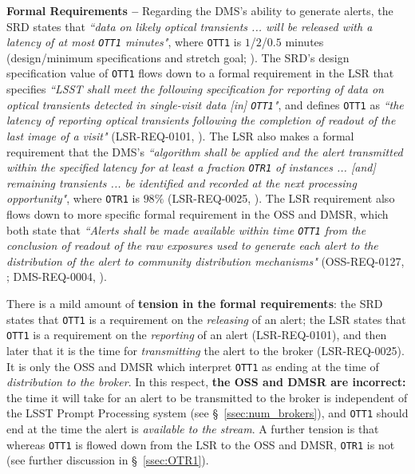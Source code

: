 \documentclass[DM,authoryear,toc]{lsstdoc}
\begin{document}
{\bf Formal Requirements --} Regarding the DMS's ability to generate alerts, the SRD states that {\it ``data on likely optical transients ... will be released with a latency of at most {\tt OTT1} minutes"}, where {\tt OTT1} is $1$/$2$/$0.5$ minutes (design/minimum specifications and stretch goal; ). The SRD's design specification value of {\tt OTT1} flows down to a formal requirement in the LSR that specifies {\it ``LSST shall meet the following specification for reporting of data on optical transients detected in single-visit data [in] {\tt OTT1}"}, and defines {\tt OTT1} as {\it ``the latency of reporting optical transients following the completion of readout of the last image of a visit"} (LSR-REQ-0101, ). The LSR also makes a formal requirement that the DMS's {\it ``algorithm shall be applied and the alert transmitted within the specified latency for at least a fraction {\tt OTR1} of instances ... [and] remaining transients ... be identified and recorded at the next processing opportunity"}, where {\tt OTR1} is $98\%$ (LSR-REQ-0025, ). The LSR requirement also flows down to more specific formal requirement in the OSS and DMSR, which both state that {\it ``Alerts shall be made available within time {\tt OTT1} from the conclusion of readout of the raw exposures used to generate each alert to the distribution of the alert to community distribution mechanisms"} (OSS-REQ-0127, ; DMS-REQ-0004, ).

There is a mild amount of {\bf tension in the formal requirements}: the SRD states that {\tt OTT1} is a requirement on the {\it releasing} of an alert; the LSR states that {\tt OTT1} is a requirement on the {\it reporting} of an alert (LSR-REQ-0101), and then later that it is the time for {\it transmitting} the alert to the broker (LSR-REQ-0025). It is only the OSS and DMSR which interpret {\tt OTT1} as ending at the time of {\it distribution to the broker}. In this respect, {\bf the OSS and DMSR are incorrect:} the time it will take for an alert to be transmitted to the broker is independent of the LSST Prompt Processing system (see \S~\ref{ssec:num_brokers}), and {\tt OTT1} should end at the time the alert is {\it available to the stream}. A further tension is that whereas {\tt OTT1} is flowed down from the LSR to the OSS and DMSR, {\tt OTR1} is not (see further discussion in \S~\ref{ssec:OTR1}).
\end{document}
